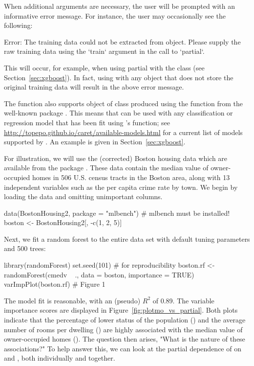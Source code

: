 When additional arguments are necessary, the user will be prompted with an informative error message. For instance, the user may occasionally see the following:
\begin{example}
Error: The training data could not be extracted from object. Please supply
the raw training data using the `train` argument in the call to `partial`.
\end{example}
This will occur, for example, when using partial with the  class (see Section~\ref{sec:xgboost}). In fact, using  with any object that does not store the original training data will result in the above error message.

The  function also supports object of class  produced using the  function from the well-known  package \citep{caret-pkg}. This means that  can be used with any classification or regression model that has been fit using 's  function; see \url{http://topepo.github.io/caret/available-models.html} for a current list of models supported by . An example is given in Section~\ref{sec:xgboost}.

For illustration, we will use the (corrected) Boston housing data which are available from the  package \citep{mlbench-pkg}. These data contain the median value of owner-occupied homes in 506 U.S. census tracts in the Boston area, along with 13 independent variables such as the per capita crime rate by town. We begin by loading the data and omitting unimportant columns.
\begin{example}
data(BostonHousing2, package = "mlbench")  # mlbench must be installed!
boston <- BostonHousing2[, -c(1, 2, 5)]
\end{example}
Next, we fit a random forest to the entire data set with default tuning parameters and 500 trees:
\begin{example}
library(randomForest)
set.seed(101)  # for reproducibility
boston.rf <- randomForest(cmedv ~ ., data = boston, importance = TRUE)
varImpPlot(boston.rf)  # Figure 1
\end{example}
The model fit is reasonable, with an  (pseudo) $R^2$ of 0.89. The variable importance scores are displayed in Figure~\ref{fig:plotmo_vs_partial}. Both plots indicate that the percentage of lower status of the population () and the average number of rooms per dwelling () are highly associated with the median value of owner-occupied homes (). The question then arises, "What is the nature of these associations?" To help answer this, we can look at the partial dependence of  on  and , both individually and together.

